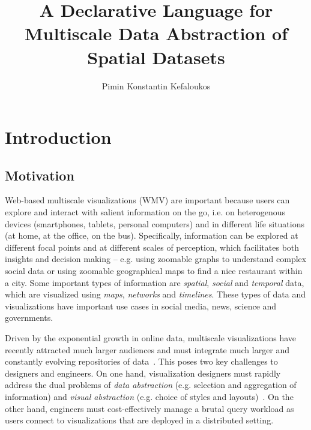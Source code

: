 \documentclass[11pt, oneside]{report}   	%
\title{A Declarative Language for Multiscale Data Abstraction of Spatial Datasets}
\author{Pimin Konstantin Kefaloukos}
\begin{document}
\maketitle

\tableofcontents

\chapter{Introduction}

\section{Motivation}
Web-based multiscale visualizations (WMV) are important because users can explore and interact with salient information on the go, i.e. on heterogenous devices (smartphones, tablets, personal computers) and in different life situations (at home, at the office, on the bus).  Specifically, information can be explored at different focal points and at different scales of perception, which facilitates both insights and decision making -- e.g. using zoomable graphs to understand complex social data or using zoomable geographical maps to find a nice restaurant within a city. Some important types of information are \emph{spatial}, \emph{social} and \emph{temporal} data, which are visualized using \emph{maps}, \emph{networks} and \emph{timelines}. These types of data and visualizations have important use cases in social media, news, science and governments.

Driven by the exponential growth in online data, multiscale visualizations have recently attracted much larger audiences and must integrate much larger and constantly evolving repositories of data~\cite{gst, foo}. This poses two key challenges to designers and engineers. On one hand, visualization designers must rapidly address the dual problems of \emph{data abstraction} (e.g. selection and aggregation of information) and \emph{visual abstraction} (e.g. choice of styles and layouts)~\cite{stolte2003multiscale}. On the other hand, engineers must cost-effectively manage a brutal query workload as users connect to visualizations that are deployed in a distributed setting.


\end{document}
